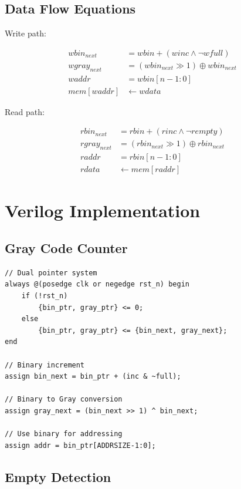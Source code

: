 \documentclass[12pt,a4paper]{article}
\begin{document}
\subsection{Data Flow Equations}

Write path:

\begin{align}
wbin_{next} &= wbin + (winc \land \neg wfull) \\
wgray_{next} &= (wbin_{next} \gg 1) \oplus wbin_{next} \\
waddr &= wbin[n-1:0] \\
mem[waddr] &\leftarrow wdata
\end{align}

Read path:

\begin{align}
rbin_{next} &= rbin + (rinc \land \neg rempty) \\
rgray_{next} &= (rbin_{next} \gg 1) \oplus rbin_{next} \\
raddr &= rbin[n-1:0] \\
rdata &\leftarrow mem[raddr]
\end{align}

\section{Verilog Implementation}

\subsection{Gray Code Counter}

\begin{lstlisting}[caption=Gray Code Counter - Style \#2]
// Dual pointer system
always @(posedge clk or negedge rst_n) begin
    if (!rst_n)
        {bin_ptr, gray_ptr} <= 0;
    else
        {bin_ptr, gray_ptr} <= {bin_next, gray_next};
end

// Binary increment
assign bin_next = bin_ptr + (inc & ~full);

// Binary to Gray conversion
assign gray_next = (bin_next >> 1) ^ bin_next;

// Use binary for addressing
assign addr = bin_ptr[ADDRSIZE-1:0];
\end{lstlisting}

\subsection{Empty Detection}
\end{document}

